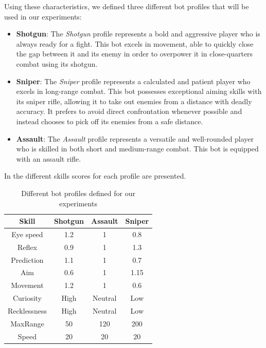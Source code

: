 Using these characteristics, we defined three different bot profiles that will be used in our experiments:
\begin{itemize}
\item \textbf{Shotgun}: The \textit{Shotgun} profile represents a bold and aggressive player who is always ready for a fight. This bot excels in movement, able to quickly close the gap between it and its enemy in order to overpower it in close-quarters combat using its shotgun.
\item \textbf{Sniper}: The \textit{Sniper} profile represents a calculated and patient player who excels in long-range combat. This bot possesses exceptional aiming skills with its sniper rifle, allowing it to take out enemies from a distance with deadly accuracy. It prefers to avoid direct confrontation whenever possible and instead chooses to pick off its enemies from a safe distance. 
\item \textbf{Assault}: The \textit{Assault} profile represents a versatile and well-rounded player who is skilled in both short and medium-range combat. This bot is equipped with an assault rifle.  
\end{itemize}

In  the different skills scores for each profile are presented.

\begin{table}
\begin{center}
\begin{tabular}{|| c || c | c | c ||}
 \hline
 Skill & Shotgun & Assault & Sniper \\ 
 \hline 
 Eye speed & 1.2 & 1 & 0.8 \\  
 Reflex & 0.9 & 1 & 1.3 \\   
 Prediction & 1.1 & 1 & 0.7 \\  
 Aim & 0.6 & 1 & 1.15 \\  
 Movement & 1.2 & 1 & 0.6 \\  
 Curiosity & High & Neutral & Low \\  
 Recklessness & High & Neutral & Low \\  
 MaxRange & 50 & 120 & 200 \\  
 Speed & 20 & 20 & 20 \\  
 \hline
\end{tabular}
\caption{Different bot profiles defined for our experiments}
\label{table:1}
\end{center}
\end{table}

